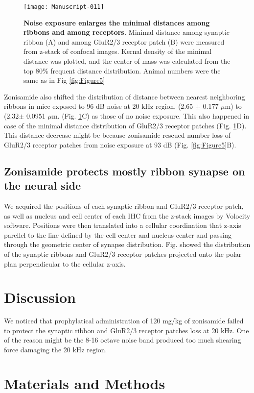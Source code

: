 \documentclass[11pt]{article}
\begin{document}
\begin{figure}[ht!]
\centering
\texttt{[image: Manuscript-011]}
\caption{{\bf {Noise exposure enlarges the minimal distances among ribbons and among receptors.}}  Minimal distance among synaptic ribbon (A) and among GluR2/3 receptor patch (B) were measured from z-stack of confocal images. Kernal density of the minimal distance was plotted, and the center of mass was calculated from the top 80\% frequent distance distribution. Animal numbers were the same as in Fig \ref{fig:Figure5}}
\label{fig:Figure6}
\end{figure}


Zonisamide also shifted the distribution of distance between nearest neighboring ribbons in mice exposed to 96 dB noise at 20 kHz region,
(2.65 $\pm$ 0.177 $\mu$m) to 
(2.32$\pm$ 0.0951 $\mu$m. (Fig. \ref{fig:Figure6}C) as those of no noise exposure. This also happened in case of the minimal distance distribution of GluR2/3 receptor patches (Fig. \ref{fig:Figure6}D). This distance decrease might be because zonisamide rescued number loss of GluR2/3 receptor patches from noise exposure at 93 dB (Fig. \ref{fig:Figure5}B). 

\subsection {Zonisamide protects mostly ribbon synapse on the neural side}

We acquired the positions of each synaptic ribbon and GluR2/3 receptor patch, as well as nucleus and cell center of each IHC from the z-stack images by Volocity software. Positions were then translated into a cellular coordination that z-axis parellel to the line defined by the cell center and nucleus center and passing through the geometric center of synapse distribution. Fig. showed the distribution of the synaptic ribbons and GluR2/3 receptor patches projected onto the polar plan perpendicular to the cellular z-axis. 

\section {Discussion}
We noticed that prophylatical administration of 120 mg/kg of zonisamide failed to protect the synaptic ribbon and GluR2/3 receptor patches loss at 20 kHz. One of the reason might be the 8-16 octave noise band produced too much shearing force damaging the 20 kHz region. 
\section{Materials and Methods}
\end{document}
